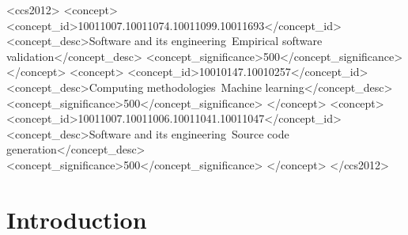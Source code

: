 \documentclass[sigconf]{acmart}
\begin{document}
\begin{CCSXML}
<ccs2012>
    <concept>
        <concept_id>10011007.10011074.10011099.10011693</concept_id>
        <concept_desc>Software and its engineering~Empirical software validation</concept_desc>
        <concept_significance>500</concept_significance>
        </concept>
    <concept>
        <concept_id>10010147.10010257</concept_id>
        <concept_desc>Computing methodologies~Machine learning</concept_desc>
        <concept_significance>500</concept_significance>
        </concept>
    <concept>
        <concept_id>10011007.10011006.10011041.10011047</concept_id>
        <concept_desc>Software and its engineering~Source code generation</concept_desc>
        <concept_significance>500</concept_significance>
        </concept>
  </ccs2012>
\end{CCSXML}





\maketitle








\section{Introduction}\label{sec:intro}





\end{document}
